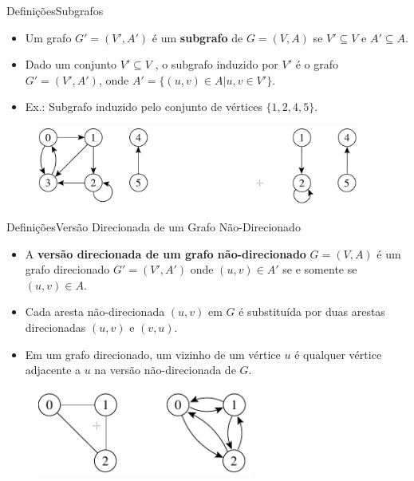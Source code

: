 \documentclass[aspectratio=169]{beamer}
\begin{document}

\begin{frame}{Definições}{Subgrafos}
\begin{itemize}
\item Um grafo $G' = (V' , A')$ é um {\bf subgrafo} de $G = (V, A)$ se $V' \subseteq V$ e $A' \subseteq A$.
\item Dado um conjunto $V' \subseteq V$ , o subgrafo induzido por $V'$ é o grafo $G' = (V' , A' )$, onde $A' = \{(u, v) \in A|u, v \in V' \}$.
\item Ex.: Subgrafo induzido pelo conjunto de vértices $\{1, 2, 4, 5\}$.
\end{itemize}
\begin{figure}[!h]
  \centering
  \includegraphics[width=300pt]{imagens/exemplo_subgrafo.png}
  \label{fig_exemplo_subgrafo}
\end{figure}
\end{frame}


\begin{frame}{Definições}{Versão Direcionada de um Grafo Não-Direcionado}
\begin{itemize}
\item A {\bf versão direcionada de um grafo não-direcionado} $G = (V, A)$ é um grafo direcionado $G' = (V' , A')$ onde $(u, v) \in A'$ se e somente se
$(u, v) \in A$.
\item Cada aresta não-direcionada $(u, v)$ em $G$ é substituída por duas arestas direcionadas $(u, v)$ e $(v, u)$.
\item Em um grafo direcionado, um vizinho de um vértice $u$ é qualquer vértice adjacente a $u$ na versão não-direcionada de $G$.
\end{itemize}
\begin{figure}[!h]
  \centering
  \includegraphics[width=200pt]{imagens/exemplo_versao_direcionada.png}
  \label{fig_exemplo_versao_direcionada}
\end{figure}
\end{frame}
\end{document}
